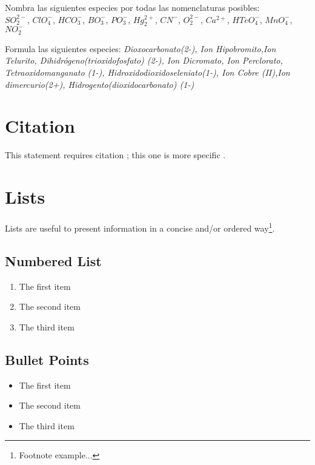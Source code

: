 \documentclass[11pt,fleqn]{book} %
\begin{document}
\begin{problem}
	Nombra las siguientes especies por todas las nomenclaturas posibles:\\ $SO_2^{2-}$, $ClO_4^{-}$, $HCO_3^{-}$, $BO_3^{-}$, $PO_3^{-}$, $Hg_2^{2+}$, $CN^{-}$, $O_2^{2-}$, $Ca^{2+}$, $HTeO_4^{-}$, $MnO_4^{-}$, $NO_2^{-}$\\
\end{problem}
\begin{problem}
Formula las siguientes especies: \textit{Dioxocarbonato(2-), Ion Hipobromito,Ion Telurito, Dihidrógeno(trioxidofosfato) (2-), Ion Dicromato, Ion Perclorato, Tetraoxidomanganato (1-), Hidroxidodioxidoseleniato(1-), Ion Cobre (II),Ion dimercurio(2+), Hidrogento(dioxidocarbonato) (1-)}
\end{problem}

\section{Citation}

This statement requires citation \cite{book_key}; this one is more specific \cite[122]{article_key}.


\section{Lists}

Lists are useful to present information in a concise and/or ordered way\footnote{Footnote example...}.

\subsection{Numbered List}

\begin{enumerate}
\item The first item
\item The second item
\item The third item
\end{enumerate}

\subsection{Bullet Points}

\begin{itemize}
\item The first item
\item The second item
\item The third item
\end{itemize}
\end{document}
